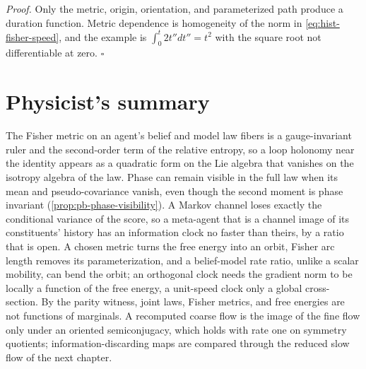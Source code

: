 \noindent\emph{Proof.}
Only the metric, origin, orientation, and parameterized path produce a duration
function.  Metric dependence is homogeneity of the norm in \eqref{eq:hist-fisher-speed},
and the example is $\int_0^t2t''dt''=t^2$ with the square root not differentiable at
zero.  $\square$

\section*{Physicist's summary}

The Fisher metric on an agent's belief and model law fibers is a gauge-invariant ruler and
the second-order term of the relative entropy, so a loop holonomy near the identity
appears as a quadratic form on the Lie algebra that vanishes on the isotropy algebra of
the law. Phase can remain visible in the full law when its mean and pseudo-covariance
vanish, even though the second moment is phase invariant
(\cref{prop:pb-phase-visibility}). A Markov channel loses exactly the conditional variance of the score, so a
meta-agent that is a channel image of its constituents' history has an information clock
no faster than theirs, by a ratio that is open.  A chosen metric turns the free energy
into an orbit, Fisher arc length removes its parameterization, and a belief-model rate
ratio, unlike a scalar mobility, can bend the orbit; an orthogonal clock needs the
gradient norm to be locally a function of the free energy, a unit-speed clock only a
global cross-section.  By the parity witness, joint laws, Fisher metrics, and free
energies are not functions of marginals.  A recomputed coarse flow is the image of the
fine flow only under an oriented semiconjugacy, which holds with rate one on symmetry
quotients; information-discarding maps are compared through the reduced slow flow of the
next chapter.
